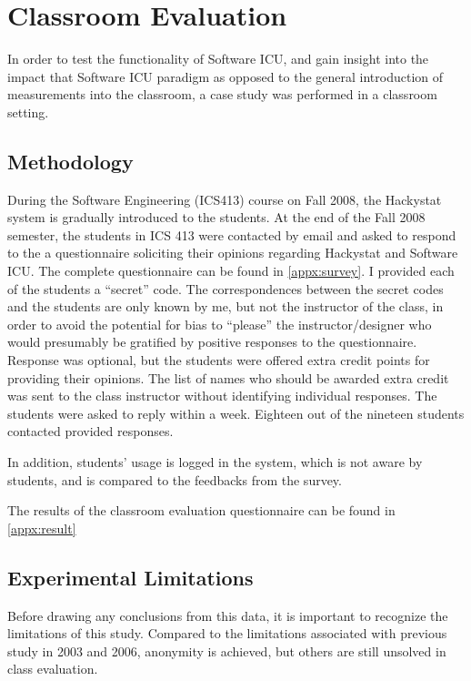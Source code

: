 
\chapter{Classroom Evaluation}
In order to test the functionality of Software ICU, and gain insight into the impact that Software ICU paradigm as opposed to the general introduction of measurements into the classroom, a case study was performed in a classroom setting.

\section{Methodology}
During the Software Engineering (ICS413) course on Fall 2008, the Hackystat system is gradually introduced to the students. At the end of the Fall 2008 semester, the students in ICS 413 were contacted by email and asked to respond to the a questionnaire soliciting their opinions regarding Hackystat and Software ICU. The complete questionnaire can be found in \autoref{appx:survey}. I provided each of the students a ``secret'' code. The correspondences between the secret codes and the students are only known by me, but not the instructor of the class, in order to avoid the potential for bias to ``please'' the instructor/designer who would presumably be gratified by positive responses to the questionnaire. Response was optional, but the students were offered extra credit points for providing their opinions. The list of names who should be awarded extra credit was sent to the class instructor without identifying individual responses. The students were asked to reply within a week. Eighteen out of the nineteen students contacted provided responses. 

In addition, students' usage is logged in the system, which is not aware by students, and is compared to the feedbacks from the survey.

The results of the classroom evaluation questionnaire can be found in \autoref{appx:result}

\section {Experimental Limitations}

Before drawing any conclusions from this data, it is important to recognize the limitations of this study. Compared to the limitations associated with previous study in 2003 and 2006, anonymity is achieved, but others are still unsolved in class evaluation.

